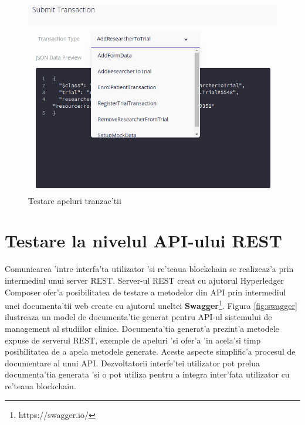 \documentclass[12pt,a4paper,twoside]{report}
\begin{document}
    
         \begin{figure}[H]
		\begin{center}
			\includegraphics[scale=0.5]{img/play-tranz.png}
			\caption{Testare apeluri tranzac'tii}
  			\label{fig:play-tranz}
  		\end{center}
  		\end{figure}
  		
    \section{Testare la nivelul API-ului REST} Comunicarea 'intre interfa'ta utilizator 'si re'teaua blockchain se realizeaz'a prin intermediul unui server REST. Server-ul REST creat cu ajutorul Hyperledger Composer ofer'a posibilitatea de testare a metodelor din API prin intermediul unei documenta'tii web create cu ajutorul uneltei \textbf{Swagger}\footnote{https://swagger.io/}. Figura \ref{fig:swagger} ilustreaza un model de documenta'tie generat pentru API-ul sistemului de management al studiilor clinice. Documenta'tia generat'a prezint'a metodele expuse de serverul REST, exemple de apeluri 'si ofer'a 'in acela'si timp posibilitatea de a apela metodele generate. Aceste aspecte simplific'a procesul de documentare al unui API. Dezvoltatorii interfe'tei utilizator pot prelua documenta'tia generata 'si o pot utiliza pentru a integra inter'fata utilizator cu re'teaua blockchain.
    
\end{document}
